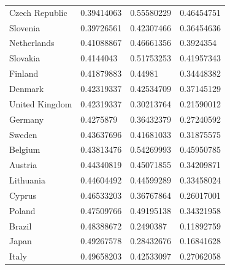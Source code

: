 \documentclass[english]{uzhpub}
\begin{document}
\begin{table}[]
\begin{tabular}{llll}
Czech Republic				 & 0.39414063 & 0.55580229            & 0.46454751     \\
Slovenia                                                   & 0.39726561 & 0.42307466            & 0.36454636     \\
Netherlands                                                & 0.41088867 & 0.46661356            & 0.3924354      \\
Slovakia                                                   & 0.4144043  & 0.51753253            & 0.41957343     \\
Finland                                                    & 0.41879883 & 0.44981               & 0.34448382     \\
Denmark                                                    & 0.42319337 & 0.42534709            & 0.37145129     \\
United Kingdom                                             & 0.42319337 & 0.30213764            & 0.21590012     \\
Germany                                                    & 0.4275879  & 0.36432379            & 0.27240592     \\
Sweden                                                     & 0.43637696 & 0.41681033            & 0.31875575     \\
Belgium                                                    & 0.43813476 & 0.54269993            & 0.45950785     \\
Austria                                                    & 0.44340819 & 0.45071855            & 0.34209871     \\
Lithuania                                                  & 0.44604492 & 0.44599289            & 0.33458024     \\
Cyprus                                                     & 0.46533203 & 0.36767864            & 0.26017001     \\
Poland                                                     & 0.47509766 & 0.49195138            & 0.34321958     \\
Brazil                                                     & 0.48388672 & 0.2490387             & 0.11892759     \\
Japan                                                      & 0.49267578 & 0.28432676            & 0.16841628     \\
Italy                                                      & 0.49658203 & 0.42533097            & 0.27062058     \\

\end{tabular}
\end{table}
\end{document}
